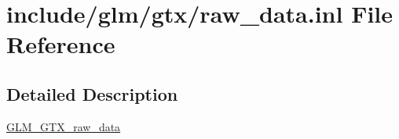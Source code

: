 \hypertarget{raw__data_8inl}{}\section{include/glm/gtx/raw\+\_\+data.inl File Reference}
\label{raw__data_8inl}


\subsection{Detailed Description}
\hyperlink{group__gtx__raw__data}{G\+L\+M\+\_\+\+G\+T\+X\+\_\+raw\+\_\+data} 
